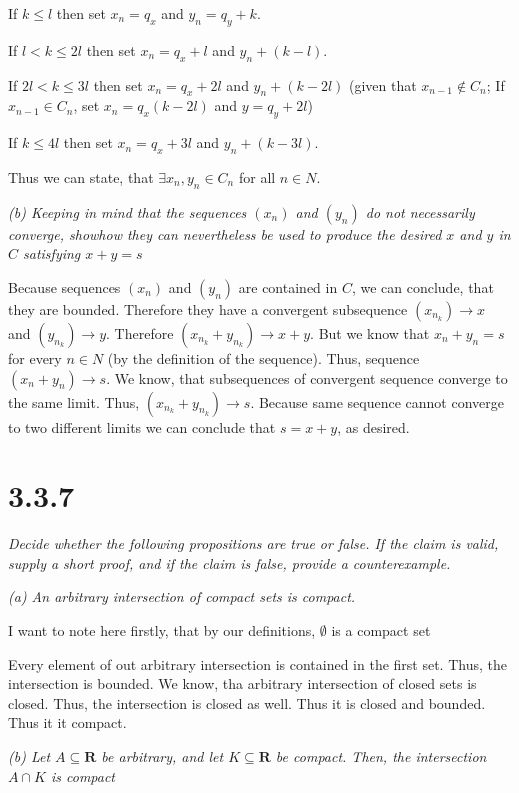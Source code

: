 \documentclass[11pt,oneside,titlepage]{book}
\begin{document}
If $k \leq l$ then set $x_n = q_x$ and $y_n = q_y + k$.

If $l < k \leq 2l$ then set $x_n = q_x + l$ and $y_n + (k - l)$.

If $2l < k \leq 3l$ then set $x_n = q_x + 2l$ and $y_n + (k - 2l)$ (given that
$x_{n - 1} \notin C_n$; If $x_{n - 1} \in C_n$, set $x_n = q_x (k - 2l)$
and $y = q_y + 2l$)

If $k \leq 4l$ then set $x_n = q_x + 3l$ and $y_n + (k - 3l)$.

Thus we can state, that $\exists x_n, y_n \in C_n$ for all $n \in N$.

\textit{(b) Keeping in mind that the sequences $(x_n)$ and $(y_n)$ do not
  necessarily converge, showhow they can nevertheless be used to produce the
  desired $x$ and $y$ in $C$ satisfying $x + y = s$}

Because sequences $(x_n)$ and $(y_n)$ are contained in $C$, we can conclude,
that they are bounded. Therefore they have a convergent subsequence
$(x_{n_k}) \to x$ and $(y_{n_k}) \to y$.
Therefore $(x_{n_k} + y_{n_k}) \to x + y$.
But we know that  $x_n + y_n = s$ for every
$n \in N$ (by the definition of the sequence). Thus, sequence
$(x_n + y_n) \to s$. We know, that subsequences of convergent sequence converge
to the same limit. Thus, $(x_{n_k} + y_{n_k}) \to s$. Because same sequence
cannot converge to two different limits we can conclude that $s = x + y$,
as desired.

\section*{3.3.7}
\textit{Decide whether the following propositions are true or false. If the claim is valid, supply a short proof, and if the claim is false, provide a counterexample.}

\textit{(a) An arbitrary intersection of compact sets is compact.}

I want to note here firstly, that by our definitions, $\emptyset$ is a
compact set

Every element of out arbitrary intersection is contained in the first set.
Thus, the intersection is bounded. We know, tha arbitrary intersection of
closed sets is closed. Thus, the intersection is closed as well. Thus it
is closed and bounded. Thus it it compact.

\textit{(b) Let $A \subseteq \textbf{R}$ be arbitrary, and let
  $K \subseteq \textbf{R}$ be compact. Then, the intersection $A \cap K$ is
  compact}
\end{document}
